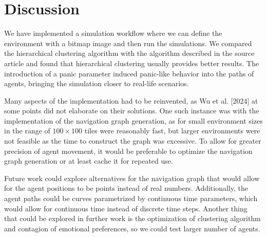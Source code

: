 \documentclass[9pt]{pnas-new}
\begin{document}
\section{Discussion}
We have implemented a simulation workflow where we can define the environment with a bitmap image and then run the simulations. We compared the hierarchical clustering algorithm with the algorithm described in the source article and found that hierarchical clustering usually provides better results. The introduction of a panic parameter induced panic-like behavior into the paths of agents, bringing the simulation closer to real-life scenarios.

Many aspects of the implementation had to be reinvented, as Wu et al. [2024] at some points did not elaborate on their solutions. One such instance was with the implementation of the navigation graph generation, as for small environment sizes in the range of $100\times 100$ tiles were reasonably fast, but larger environments were not feasible as the time to construct the graph was excessive. To allow for greater precision of agent movement, it would be preferable to optimize the navigation graph generation or at least cache it for repeated use.

Future work could explore alternatives for the navigation graph that would allow for the agent positions to be points instead of real numbers. Additionally, the agent paths could be curves parametrized by continuous time parameters, which would allow for continuous time instead of discrete time steps. Another thing that could be explored in further work is the optimization of clustering algorithm and contagion of emotional preferences, so we could test larger number of agents.

\showacknow %


\begin{multicols}{2}
\section*{\bibname}

\end{multicols}
\end{document}
